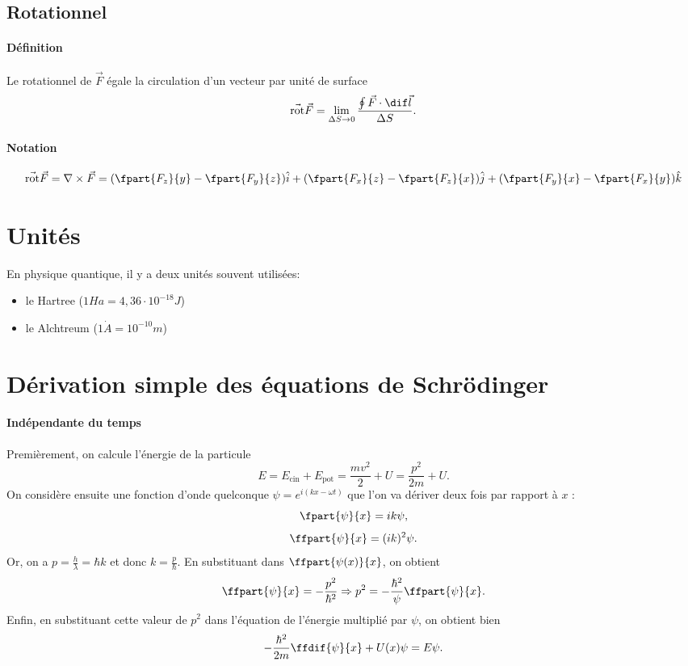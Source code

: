 \subsection{Rotationnel}
\paragraph{Définition}
Le rotationnel de $\vec{F}$ égale la circulation d'un vecteur
par unité de surface
\[ \vec{{\rm rot}}{\vec{F}} = \lim_{\Delta S \to 0} \frac{\oint{\vec{F}\cdot\dif\vec{l}}}{\Delta S}.\] 
\paragraph{Notation}
\[ \vec{{\rm rot}}{\vec{F}} = \nabla\times\vec{F} = (\fpart{F_z}{y}-\fpart{F_y}{z})\hat{i}
+ (\fpart{F_x}{z}-\fpart{F_z}{x})\hat{j} + (\fpart{F_y}{x}-\fpart{F_x}{y})\hat{k}\]

\section{Unités}
En physique quantique, il y a deux unités souvent utilisées:
\begin{itemize}
\item le Hartree ($1Ha =  4,36\cdot 10^{-18} J$)
\item le Alchtreum ($1 \dot{A} = 10^{-10} m$)
\end{itemize}

\section{Dérivation simple des équations de Schrödinger}
\label{sec:deriv-eq}
\paragraph{Indépendante du temps}
Premièrement, on calcule l'énergie de la particule
\[ E = E_{\text{cin}} + E_{\text{pot}} = \frac{mv^2}{2} + U = \frac{p^2}{2m} + U.\]
On considère ensuite une fonction d'onde quelconque $\psi = e^{i(kx-\omega t)}$
que l'on va dériver deux fois par rapport à $x$ :
\[ \fpart{\psi}{x} = ik\psi ,\]
\[ \ffpart{\psi}{x} = (ik)^2\psi. \]
Or, on a $p = \frac{h}{\lambda} = \hbar k$ et donc $k = \frac{p}{\hbar}$.
En substituant dans $\ffpart{\psi(x)}{x}$, on obtient
\[ \ffpart{\psi}{x} = -\frac{p^2}{\hbar^2} \Rightarrow p^2 =
-\frac{\hbar^2}{\psi}\ffpart{\psi}{x}.\]
Enfin, en substituant cette valeur de $p^2$ dans l'équation de l'énergie
multiplié par $\psi$, on obtient bien
\[ -\frac{\hbar^2}{2m}\ffdif{\psi}{x} + U(x)\psi = E\psi.\]

